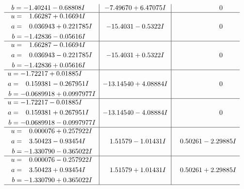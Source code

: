 \documentclass[1p]{elsarticle_modified}
\theoremstyle{definition}
\begin{document}
$$\begin{array}{c|c|c}
\begin{aligned}
b &= -1.40241 - 0.68808 I\end{aligned}
 & -7.49670 + 6.47075 I & \phantom{-0.000000 } 0 \\ \hline\begin{aligned}
u &= \phantom{-}1.66287 + 0.16694 I \\
a &= \phantom{-}0.036943 + 0.221785 I \\
b &= -1.42836 - 0.05616 I\end{aligned}
 & -15.4031 - 0.5322 I & \phantom{-0.000000 } 0 \\ \hline\begin{aligned}
u &= \phantom{-}1.66287 - 0.16694 I \\
a &= \phantom{-}0.036943 - 0.221785 I \\
b &= -1.42836 + 0.05616 I\end{aligned}
 & -15.4031 + 0.5322 I & \phantom{-0.000000 } 0 \\ \hline\begin{aligned}
u &= -1.72217 + 0.01885 I \\
a &= \phantom{-}0.159381 - 0.267951 I \\
b &= -0.0689918 + 0.0997977 I\end{aligned}
 & -13.14540 + 4.08884 I & \phantom{-0.000000 } 0 \\ \hline\begin{aligned}
u &= -1.72217 - 0.01885 I \\
a &= \phantom{-}0.159381 + 0.267951 I \\
b &= -0.0689918 - 0.0997977 I\end{aligned}
 & -13.14540 - 4.08884 I & \phantom{-0.000000 } 0 \\ \hline\begin{aligned}
u &= \phantom{-}0.000076 + 0.257922 I \\
a &= \phantom{-}3.50423 - 0.93454 I \\
b &= -1.330790 - 0.365022 I\end{aligned}
 & \phantom{-}1.51579 - 1.01431 I & \phantom{-}0.50261 - 2.29885 I \\ \hline\begin{aligned}
u &= \phantom{-}0.000076 - 0.257922 I \\
a &= \phantom{-}3.50423 + 0.93454 I \\
b &= -1.330790 + 0.365022 I\end{aligned}
 & \phantom{-}1.51579 + 1.01431 I & \phantom{-}0.50261 + 2.29885 I\\
 \hline 
 \end{array}$$\newpage
\end{document}
